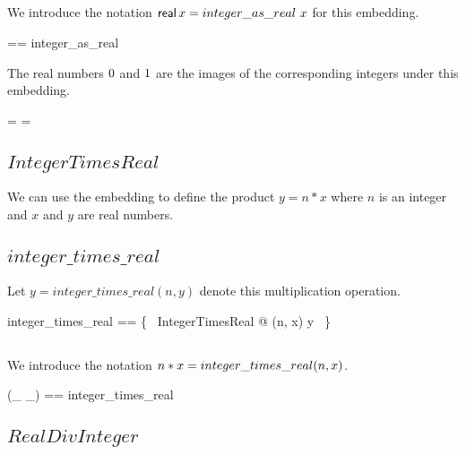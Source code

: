 \documentclass[11pt, oneside]{article}
\begin{document}
\subsection{}

We introduce the notation $\operatorname{\mathsf{real}} x = integer\_as\_real~x$ for this embedding.

\begin{zed}
	\asZR == integer\_as\_real
\end{zed}

The real numbers $0$ and $1$ are the images of the corresponding integers under this
embedding.

\begin{zed}
	 = \zeroR
\also
	 = \oneR
\end{zed}

\subsection{$IntegerTimesReal$}

We can use the embedding to define the product $y = n * x$ where $n$ is an integer
and $x$ and $y$ are real numbers.


\subsection{$integer\_times\_real$}

Let $y = integer\_times\_real(n, y)$ denote this multiplication operation.

\begin{zed}
	integer\_times\_real == \{~ IntegerTimesReal @ (n, x) \mapsto y ~\}
\end{zed}

\subsection{}

We introduce the notation $n \mathbin{*} x = integer\_times\_real(n, x)$.

\begin{zed}
	(\_ \mulZR \_) == integer\_times\_real
\end{zed}

\subsection{$RealDivInteger$}
\end{document}

